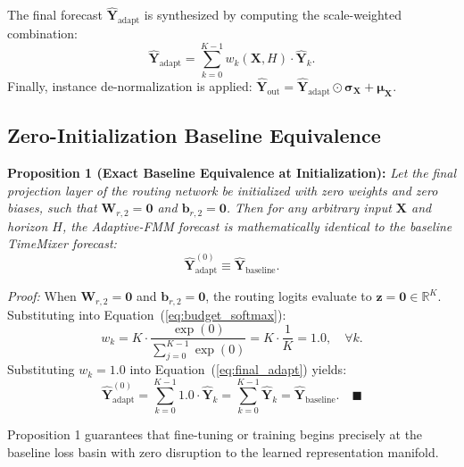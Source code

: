 \documentclass[journal]{IEEEtran}
\begin{document}
The final forecast $\hat{\mathbf{Y}}_{\text{adapt}}$ is synthesized by computing the scale-weighted combination:
\begin{equation}
\label{eq:final_adapt}
\hat{\mathbf{Y}}_{\text{adapt}} = \sum_{k=0}^{K-1} w_k(\mathbf{X}, H) \cdot \hat{\mathbf{Y}}_k.
\end{equation}
Finally, instance de-normalization is applied: $\hat{\mathbf{Y}}_{\text{out}} = \hat{\mathbf{Y}}_{\text{adapt}} \odot \boldsymbol{\sigma}_{\mathbf{X}} + \boldsymbol{\mu}_{\mathbf{X}}$.

\subsection{Zero-Initialization Baseline Equivalence}
\textbf{Proposition 1 (Exact Baseline Equivalence at Initialization):}
\textit{Let the final projection layer of the routing network be initialized with zero weights and zero biases, such that $\mathbf{W}_{r,2} = \mathbf{0}$ and $\mathbf{b}_{r,2} = \mathbf{0}$. Then for any arbitrary input $\mathbf{X}$ and horizon $H$, the Adaptive-FMM forecast is mathematically identical to the baseline TimeMixer forecast:}
\begin{equation}
\hat{\mathbf{Y}}_{\text{adapt}}^{(0)} \equiv \hat{\mathbf{Y}}_{\text{baseline}}.
\end{equation}

\textit{Proof:} When $\mathbf{W}_{r,2} = \mathbf{0}$ and $\mathbf{b}_{r,2} = \mathbf{0}$, the routing logits evaluate to $\mathbf{z} = \mathbf{0} \in \mathbb{R}^K$. Substituting into Equation~(\ref{eq:budget_softmax}):
\begin{equation}
w_k = K \cdot \frac{\exp(0)}{\sum_{j=0}^{K-1} \exp(0)} = K \cdot \frac{1}{K} = 1.0, \quad \forall k.
\end{equation}
Substituting $w_k = 1.0$ into Equation~(\ref{eq:final_adapt}) yields:
\begin{equation}
\hat{\mathbf{Y}}_{\text{adapt}}^{(0)} = \sum_{k=0}^{K-1} 1.0 \cdot \hat{\mathbf{Y}}_k = \sum_{k=0}^{K-1} \hat{\mathbf{Y}}_k = \hat{\mathbf{Y}}_{\text{baseline}}. \quad \blacksquare
\end{equation}

Proposition 1 guarantees that fine-tuning or training begins precisely at the baseline loss basin with zero disruption to the learned representation manifold.
\end{document}
